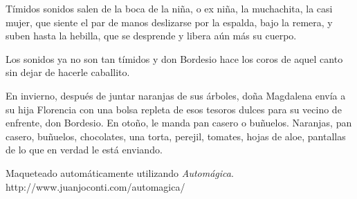 \documentclass[11pt,twoside,openright]{book}
\begin{document}
Tímidos sonidos salen de la boca de la niña, o ex niña, la muchachita, la casi mujer, que siente el par de manos deslizarse por la espalda, bajo la remera, y suben  hasta la hebilla, que se desprende y libera aún más su cuerpo.

Los sonidos ya no son tan tímidos y don Bordesio hace los coros de aquel canto sin dejar de hacerle caballito.

En invierno, después de juntar naranjas de sus árboles, doña Magdalena envía a su hija Florencia con una bolsa repleta de esos tesoros dulces para su vecino de enfrente, don Bordesio. En otoño, le manda pan casero o buñuelos. Naranjas, pan casero, buñuelos, chocolates, una torta, perejil, tomates, hojas de aloe, pantallas de lo que en verdad le está enviando.



\cleardoublepage

%

\hspace{0pt}
\vfill
\begin{center}
Maqueteado automáticamente utilizando \emph{Automágica}.
\bigbreak
http://www.juanjoconti.com/automagica/
\end{center}
\vfill
\hspace{0pt}
\end{document}
